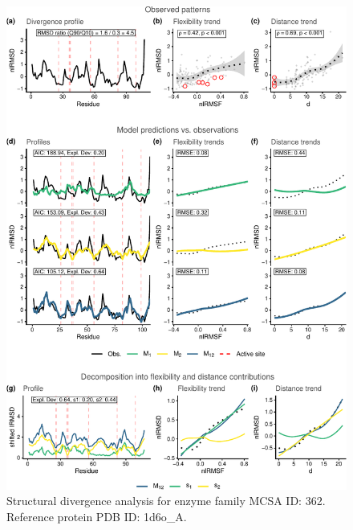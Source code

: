 \documentclass[
]{article}
\begin{document}
\clearpage
\begin{figure}[H]
\centering


\begin{center}\includegraphics{supplementary_material_files/figure-latex/generate_figures-18} \end{center}

\caption{Structural divergence analysis for enzyme family MCSA ID: 362. Reference protein PDB ID: 1d6o\_A.}
\end{figure}
\end{document}
